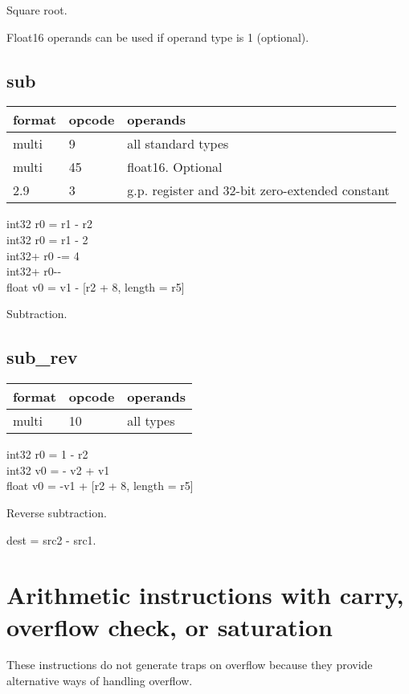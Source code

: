 \documentclass[forwardcom.tex]{subfiles}
\begin{document}
Square root.
\vv

Float16 operands can be used if operand type is 1 (optional).
\vv


\subsection{sub}
\label{table:subInstruction}
\begin{tabular}{|p{12mm}|p{15mm}|p{100mm}|}
\hline
\bfseries format & \bfseries opcode & \bfseries operands \\ \hline
multi &  9 & all standard types \\ \hline
multi & 45 & float16. Optional \\ \hline
2.9   &  3 & g.p. register and 32-bit zero-extended constant \\ \hline
\end{tabular}
\vv

int32 r0 = r1 - r2 \\
int32 r0 = r1 - 2 \\
int32+ r0 -= 4 \\
int32+ r0-{-} \\
float v0 = v1 - [r2 + 8, length = r5]
\vv

Subtraction.
\vv


\subsection{sub\_rev}
\label{table:subRevInstruction}
\begin{tabular}{|p{12mm}|p{15mm}|p{100mm}|}
\hline
\bfseries format & \bfseries opcode & \bfseries operands \\ \hline
multi & 10 & all types \\ \hline
\end{tabular}
\vv

int32 r0 = 1 - r2 \\
int32 v0 = - v2 + v1 \\
float v0 = -v1 + [r2 + 8, length = r5]
\vv

Reverse subtraction.
\vv

dest = src2 - src1.
\vv


\section{Arithmetic instructions with carry, overflow check, or saturation}
These instructions do not generate traps on overflow because they provide alternative ways of handling overflow.
\vv
\end{document}
